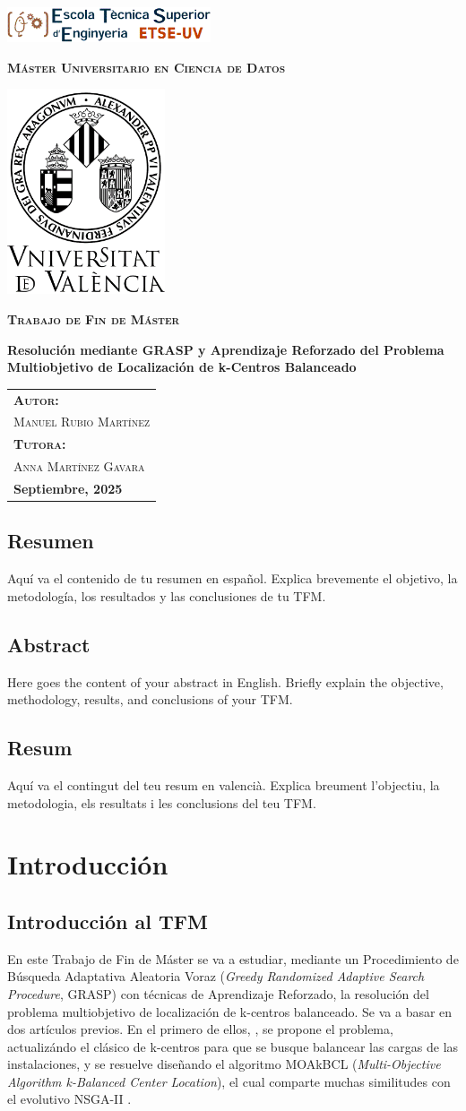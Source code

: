 \documentclass[12pt,a4paper]{book}
\newcommand{\nuevaportada}[6]{
    \thispagestyle{empty}
    \begin{center}
        \vfill 
        
        \includegraphics[width=0.45\textwidth]{images/logo.png}
        
        \vspace{0.5cm} %
        {\large\bfseries\textsc{M\'aster Universitario en #1}\par} %
        
        \vspace{0.5cm}
        \includegraphics[width=0.35\textwidth]{images/uv.png} %
        
        \vspace{0.5cm}
        {\large\bfseries\textsc{Trabajo de Fin de M\'aster}\par} %
        
        \vfill 
        
        {\LARGE\bfseries #2\par} %
        
        \vfill %
        
        \begin{flushright}
            \begin{tabular}{l} 
                {\large\bfseries\textsc{Autor:}} \\
                {\large\textsc{#3}} \\ [0.2cm] %
                {\large\bfseries\textsc{Tutora:}} \\ 
                {\large\textsc{#4}} \\ [0.2cm] %
                {\large\bfseries #5} 
            \end{tabular}
        \end{flushright}
        
        \vfill %
    \end{center}
}
\begin{document}
\nuevaportada{Ciencia de Datos}{Resolución mediante GRASP y Aprendizaje Reforzado del Problema Multiobjetivo de Localización de k-Centros Balanceado }{Manuel Rubio Martínez}{Anna Martínez Gavara}{Septiembre, 2025}

\clearpage

\newpage
\tableofcontents

\newpage

\section*{Resumen}
Aquí va el contenido de tu resumen en español. Explica brevemente el objetivo, la metodología, los resultados y las conclusiones de tu TFM.

\newpage

\section*{Abstract}
Here goes the content of your abstract in English. Briefly explain the objective, methodology, results, and conclusions of your TFM.

\newpage

\section*{Resum}
Aquí va el contingut del teu resum en valencià. Explica breument l'objectiu, la metodologia, els resultats i les conclusions del teu TFM.

\newpage
 
\chapter{Introducción}

\section{Introducción al TFM}
En este Trabajo de Fin de Máster se va a estudiar, mediante un Procedimiento de Búsqueda Adaptativa Aleatoria Voraz (\textit{Greedy Randomized Adaptive Search Procedure}, GRASP) con técnicas de Aprendizaje Reforzado, la resolución del problema multiobjetivo de localización de k-centros balanceado.
Se va a basar en dos artículos previos. En el primero de ellos, \citet{k-balanced_1}, se propone el problema, actualizándo el clásico de k-centros para que se busque balancear las cargas de las instalaciones,
y se resuelve diseñando el algoritmo MOAkBCL (\textit{Multi-Objective Algorithm k-Balanced Center Location}), el cual comparte muchas similitudes con el evolutivo NSGA-II \cite{NSGA-II}.
\end{document}
